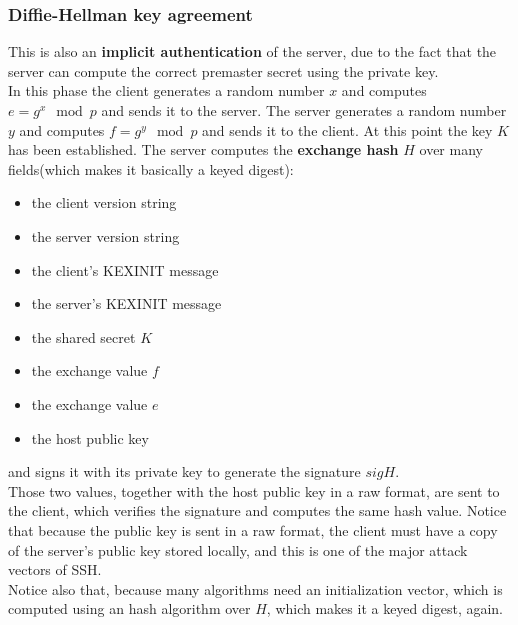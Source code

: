 \subsubsection{Diffie-Hellman key agreement}
This is also an \textbf{implicit authentication} of the server, due to
the fact that the server can compute the correct premaster secret
using the private key.\\
In this phase the client generates a random number $x$ and computes
$e=g^x \mod p$ and sends it to the server. The server generates a
random number $y$ and computes $f=g^y \mod p$ and sends it to the
client. At this point the key $K$ has been established. The server
computes the \textbf{exchange hash} $H$ over many fields(which makes
it basically a keyed digest): 
\begin{itemize}
  \item the client version string
  \item the server version string
  \item the client's KEXINIT message
  \item the server's KEXINIT message
  \item the shared secret $K$
  \item the exchange value $f$
  \item the exchange value $e$
  \item the host public key
\end{itemize}
and signs it with its private key to generate the signature $sigH$.\\
Those two values, together with the host public key in a raw format,
are sent to the client, which verifies the signature and computes the
same hash value. Notice that because the public key is sent in a raw 
format, the client must have a copy of the server's public key stored 
locally, and this is one of the major attack vectors of SSH.\\
Notice also that, because many algorithms need an initialization
vector, which is computed using an hash algorithm over $H$, which
makes it a keyed digest, again.


